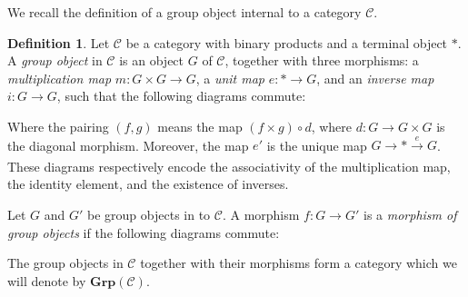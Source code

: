 \documentclass{article}
\theoremstyle{plain}
\theoremstyle{definition}
\newtheorem{Def}[Th]{Definition}
\DeclareMathOperator{\id}{id}
\begin{document}
We recall the definition of a group object internal to a category $\mathcal{C}$.
\begin{Def}\label{def:group object}
    Let $\mathcal{C}$ be a category with binary products and a terminal object $\ast$. A \textit{group object} in $\mathcal{C}$ is an object $G$ of 
    $\mathcal{C}$, together with three morphisms: a \textit{multiplication map}  $m\colon G\times G\to G$, a \textit{unit map}  $e\colon\ast \to G$, and an \textit{inverse map} $i\colon G\to G$, such that the following diagrams commute:
    \begin{center}
        \quad 

\end{center}
Where the pairing $(f, g)$ means the map $(f\times g)\circ d$, where $d\colon G\to G\times G$ is the diagonal morphism. Moreover, the map $e'$ is the unique map $G\to \ast\xrightarrow[]{e}G$. These diagrams respectively encode the associativity of the multiplication map, the identity element, and the existence of inverses. 

Let $G$ and $G'$ be group objects in to $\mathcal{C}$. A morphism $f\colon  G\to G'$ is a \textit{morphism of group objects} if the following diagrams commute:
\begin{center}
\end{center}
The group objects in $\mathcal{C}$ together with their morphisms form a category which we will denote by $\textbf{Grp}(\mathcal{C})$.
\end{Def}
\end{document}
